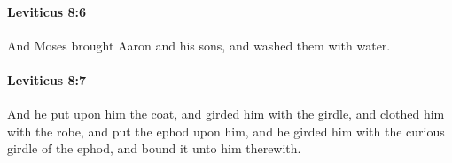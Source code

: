 		\paragraph{Leviticus 8:6} %
			\label{LEVITICUS-8-6}

			And Moses brought Aaron and his sons, and washed them with water.


		\paragraph{Leviticus 8:7} %
			\label{LEVITICUS-8-7}

			And he put upon him the coat, and girded him with the girdle, and clothed him with the robe, and put the ephod upon him, and he girded him with the curious girdle of the ephod, and bound it unto him therewith.


